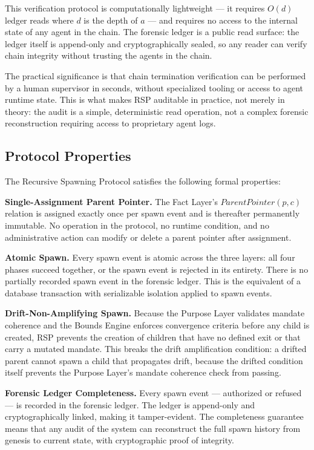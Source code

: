 This verification protocol is computationally lightweight — it requires $O(d)$ ledger reads where $d$ is the depth of $a$ — and requires no access to the internal state of any agent in the chain. The forensic ledger is a public read surface: the ledger itself is append-only and cryptographically sealed, so any reader can verify chain integrity without trusting the agents in the chain.

The practical significance is that chain termination verification can be performed by a human supervisor in seconds, without specialized tooling or access to agent runtime state. This is what makes RSP auditable in practice, not merely in theory: the audit is a simple, deterministic read operation, not a complex forensic reconstruction requiring access to proprietary agent logs.

\subsection{Protocol Properties}

The Recursive Spawning Protocol satisfies the following formal properties:

\bigskip
\noindent\textbf{Single-Assignment Parent Pointer.} The Fact Layer's $ParentPointer(p, c)$ relation is assigned exactly once per spawn event and is thereafter permanently immutable. No operation in the protocol, no runtime condition, and no administrative action can modify or delete a parent pointer after assignment.

\bigskip
\noindent\textbf{Atomic Spawn.} Every spawn event is atomic across the three layers: all four phases succeed together, or the spawn event is rejected in its entirety. There is no partially recorded spawn event in the forensic ledger. This is the equivalent of a database transaction with serializable isolation applied to spawn events.

\bigskip
\noindent\textbf{Drift-Non-Amplifying Spawn.} Because the Purpose Layer validates mandate coherence and the Bounds Engine enforces convergence criteria before any child is created, RSP prevents the creation of children that have no defined exit or that carry a mutated mandate. This breaks the drift amplification condition: a drifted parent cannot spawn a child that propagates drift, because the drifted condition itself prevents the Purpose Layer's mandate coherence check from passing.

\bigskip
\noindent\textbf{Forensic Ledger Completeness.} Every spawn event — authorized or refused — is recorded in the forensic ledger. The ledger is append-only and cryptographically linked, making it tamper-evident. The completeness guarantee means that any audit of the system can reconstruct the full spawn history from genesis to current state, with cryptographic proof of integrity.

